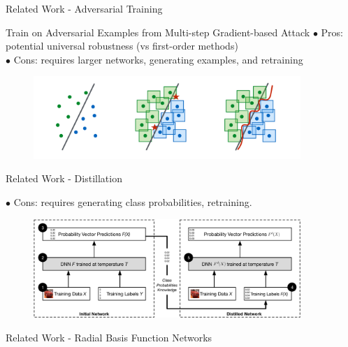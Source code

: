 \documentclass{beamer}
\begin{document}
\begin{frame}{Related Work - Adversarial Training \cite{madry2019deep}}
    \begin{block}{Train on Adversarial Examples from Multi-step Gradient-based Attack }
        $\bullet$ Pros: potential universal robustness (vs first-order methods) \\
        $\bullet$ Cons: requires larger networks, generating examples, and retraining 
    \end{block}
    
   \begin{figure} 
       \includegraphics[width=0.9\textwidth]{images/Related-Work/adversarial-training.PNG}
       \caption*{}
   \end{figure}
    
\end{frame}

\begin{frame}{Related Work - Distillation \cite{Papernot2016DistillationAA} }

    \begin{block}{}
         $\bullet$ Cons: requires generating class probabilities, retraining.
    \end{block}

    
   \begin{figure} 
       \includegraphics[width=0.9\textwidth]{images/Related-Work/distillation.png}
       \caption*{}
   \end{figure}
    
\end{frame}

\begin{frame}{Related Work - Radial Basis Function Networks}

\end{frame}
\end{document}

